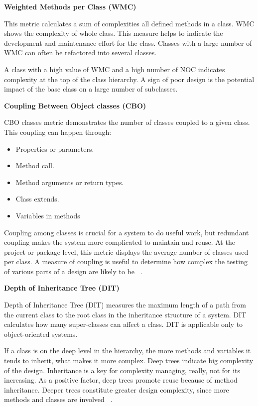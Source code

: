 \textbf{Weighted Methods per Class (WMC)}

This metric calculates a sum of complexities all defined methods in a class. WMC shows the complexity of whole class. This measure helps to indicate the development and maintenance effort for the class. Classes with a large number of WMC can often be refactored into several classes.

A class with a high value of WMC and a high number of NOC indicates complexity at the top of the class hierarchy. A sign of poor design is the potential impact of the base class on a large number of subclasses.

\textbf{Coupling Between Object classes (CBO)}

CBO classes metric demonstrates the number of classes coupled to a given class. This coupling can happen through:
\begin{itemize}
	\item Properties or parameters. 
	\item Method call. 
	\item Method arguments or return types.
	\item Class extends.
	\item Variables in methods
\end{itemize}

Coupling among classes is crucial for a system to do useful work, but redundant coupling makes the system more complicated to maintain and reuse. At the project or package level, this metric displays the average number of classes used per class. A measure of coupling is useful to determine how complex the testing of various parts of a design are likely to be ~\cite{ck}.

\textbf{Depth of Inheritance Tree (DIT)}

Depth of Inheritance Tree (DIT) measures the maximum length of a path from the current class to the root class in the inheritance structure of a system. DIT calculates how many super-classes can affect a class. DIT is applicable only to object-oriented systems.

If a class is on the deep level in the hierarchy, the more methods and variables it tends to inherit, what makes it more complex. Deep trees indicate big complexity of the design. Inheritance is a key for complexity managing, really, not for its increasing. As a positive factor, deep trees promote reuse because of method inheritance. Deeper trees constitute greater design complexity, since more methods and classes are involved ~\cite{ck}.

